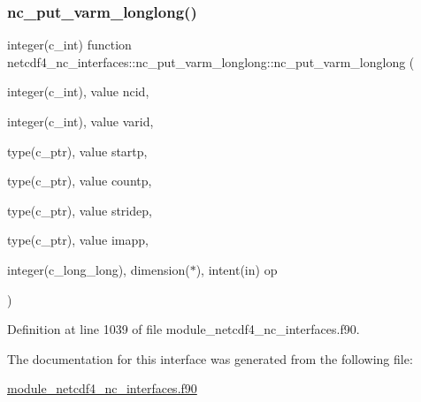 \subsubsection{\texorpdfstring{nc\+\_\+put\+\_\+varm\+\_\+longlong()}{nc\_put\_varm\_longlong()}}
{\footnotesize\ttfamily integer(c\+\_\+int) function netcdf4\+\_\+nc\+\_\+interfaces\+::nc\+\_\+put\+\_\+varm\+\_\+longlong\+::nc\+\_\+put\+\_\+varm\+\_\+longlong (\begin{DoxyParamCaption}\item[{integer(c\+\_\+int), value}]{ncid,  }\item[{integer(c\+\_\+int), value}]{varid,  }\item[{type(c\+\_\+ptr), value}]{startp,  }\item[{type(c\+\_\+ptr), value}]{countp,  }\item[{type(c\+\_\+ptr), value}]{stridep,  }\item[{type(c\+\_\+ptr), value}]{imapp,  }\item[{integer(c\+\_\+long\+\_\+long), dimension($\ast$), intent(in)}]{op }\end{DoxyParamCaption})}



Definition at line 1039 of file module\+\_\+netcdf4\+\_\+nc\+\_\+interfaces.\+f90.



The documentation for this interface was generated from the following file\+:\begin{DoxyCompactItemize}
\item 
\hyperlink{module__netcdf4__nc__interfaces_8f90}{module\+\_\+netcdf4\+\_\+nc\+\_\+interfaces.\+f90}\end{DoxyCompactItemize}
